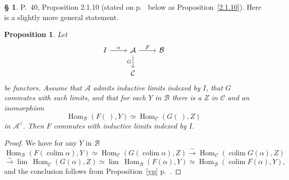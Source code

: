 \documentclass[12pt]{article}
\newtheorem{prop}[thm]{Proposition}
\theoremstyle{remark}
\theoremstyle{definition}
\newtheorem{s}[thm]{\S}
\newcommand{\A}{\mathcal A}
\newcommand{\B}{\mathcal B}
\newcommand{\C}{\mathcal C}
\newcommand{\xr}{\xrightarrow}
\DeclareMathOperator*{\colim}{colim}
\DeclareMathOperator{\Hom}{Hom}
\begin{document}
\begin{s} 
P.~40, Proposition 2.1.10 (stated on p.~\pageref{2.1.10} below as Proposition~\ref{2.1.10}). Here is a slightly more general statement. 
%
\begin{prop}\label{2.1.10b}
Let 
$$
\begin{tikzcd}
I\ar{r}{\alpha}&\A\ar{d}[swap]{G}\ar{r}{F}&\B\\
&\C
\end{tikzcd}
$$
be functors. Assume that $\A$ admits inductive limits indexed by $I$, that $G$ commutes with such limits, and that for each $Y$ in $\B$ there is a $Z$ in $\C$ and an isomorphism 
$$
\Hom_\B(F(\ ),Y)\simeq\Hom_\C(G(\ ),Z)
$$
in $\A^\wedge$. Then $F$ commutes with inductive limits indexed by $I$.
\end{prop}
%
\begin{proof}
We have for any $Y$ in $\B$ 
$$ 
\Hom_\B\left(F\left(\colim\alpha\right),Y\right)\simeq
\Hom_\C\left(G\left(\colim\alpha\right),Z\right)
\xr\sim
\Hom_\C\left(\colim G(\alpha),Z\right)
$$
$$
\xr\sim\lim \ \Hom_\C(G(\alpha),Z)\simeq\lim \ \Hom_\B(F(\alpha),Y)\simeq\Hom_\B(\colim F(\alpha),Y),
$$ 
and the conclusion follows from Proposition~\ref{yp} p.~\pageref{yp}.
\end{proof}
\end{s}

%
\end{document}
